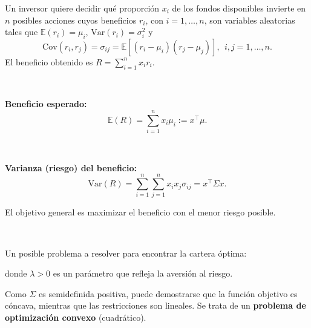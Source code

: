 \begin{example}

Un inversor quiere decidir qué proporción  $x_i$ de los fondos disponibles invierte
en $n$ posibles acciones cuyos beneficios $r_i$, con $i=1,\ldots,n$, son variables aleatorias tales que $\mathbb{E}(r_i)=\mu_i$, $\mbox{Var}(r_i)=\sigma^2_i$ y 
\[
\mbox{Cov}(r_i,r_j) = \sigma_{ij} = \mathbb{E}[(r_i-\mu_i)(r_j-\mu_j)], \ \ i,j=1,\ldots, n.
\]
El beneficio obtenido es $R=\sum_{i=1}^n x_ir_i$.


\

\textbf{Beneficio esperado:} 
\[
\mathbb{E}(R)=\sum_{i=1}^n x_i\mu_i := x^\top \mu.
\]

\

\textbf{Varianza (riesgo) del beneficio:}
\[
\mbox{Var}(R) = \sum_{i=1}^n \sum_{j=1}^n x_ix_j\sigma_{ij} = x^\top\Sigma x.
\]

El objetivo general es maximizar el beneficio con el menor riesgo posible.

\

Un posible problema a resolver para encontrar la cartera óptima:
\begin{ioprob}
donde $\lambda>0$ es un parámetro que refleja la aversión al riesgo.
\end{ioprob}

Como $\Sigma$ es semidefinida positiva, puede demostrarse que la función objetivo es cóncava, mientras que las restricciones son lineales. Se trata de un \textbf{problema de optimización convexo} (cuadrático).


\end{example}
